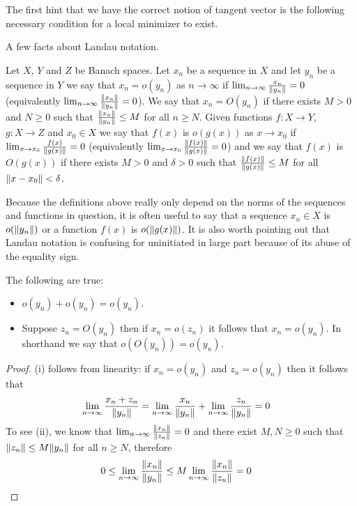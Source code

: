 The first hint that we have the correct notion of tangent vector is
the following necessary condition for a local minimizer to exist.

A few facts about Landau notation.
\begin{defn}Let $X$, $Y$ and $Z$ be Banach spaces.  Let $x_n$ be a sequence in $X$ and let
  $y_n$ be a sequence in  $Y$ we say that $x_n = o(y_n)$
  as $n \to \infty$ if $\lim_{n \to \infty} \frac{x_n}{\lVert y_n \rVert} =
  0$ (equivalently $\lim_{n \to \infty} \frac{\lVert x_n \rVert}{\lVert y_n \rVert} =
  0$).  We say that $x_n = O(y_n)$ if there exists $M > 0$ and $N \geq
  0$ such that
  $\frac{\lVert x_n \rVert}{\lVert y_n \rVert}  \leq M$ for all $n \geq N$.  
Given functions $f : X \to Y$, $g : X \to Z$ and $x_0 \in X$ we say that
  $f(x)$ is $o(g(x))$ as $x \to x_0$ if $\lim_{x \to x_0}
  \frac{f(x)}{\lVert g(x) \rVert} = 0$ (equivalently $\lim_{x \to x_0}
  \frac{\lVert f(x) \rVert}{\lVert g(x) \rVert} = 0$) and we say that $f(x)$ is
  $O(g(x))$ if there exists $M > 0$ and $\delta > 0$ such that
  $\frac{\lVert f(x) \rVert}{\lVert g(x) \rVert} \leq M$ for all $\lVert x - x_0 \rVert < \delta$.
\end{defn}
Because the definitions above really only depend on the norms of the
sequences and functions in question, it is often useful to say that a
sequence $x_n \in X$ is $o(\lVert y_n \rVert)$ or a function $f(x)$ is
$o(\lVert g(x) \rVert)$.  It is also worth pointing out that Landau notation
is confusing for uninitiated in large part because of its abuse of the
equality sign.  

\begin{prop}\label{LandauNotationIdentities}The following are true:
\begin{itemize}
\item[(i)] $o(y_n) + o(y_n) = o(y_n)$.
\item[(ii)] Suppose $z_n = O(y_n)$ then if $x_n = o(z_n)$ it follows
  that $x_n = o(y_n)$.  In shorthand we say that $o(O(y_n)) = o(y_n)$.
\end{itemize}
\end{prop}
\begin{proof}
(i) follows from linearity: if $x_n = o(y_n)$ and $z_n = o(y_n)$ then
it follows that 
\begin{align*}
\lim_{n \to \infty} \frac{x_n + z_n}{\lVert y_n \rVert} &= 
\lim_{n \to \infty} \frac{x_n}{\lVert y_n \rVert}
+ \lim_{n \to \infty} \frac{z_n}{\lVert y_n \rVert}
= 0
\end{align*}
To see (ii), we know that $\lim_{n \to \infty} \frac{\lVert x_n \rVert}{\lVert z_n \rVert} =
0$ and there exist $M,N \geq 0$ such that $\lVert z_n \rVert \leq M
\lVert y_n \rVert$ for all $n \geq N$, therefore 
\begin{align*}
0 &\leq \lim_{n \to \infty} \frac{\lVert x_n \rVert}{\lVert y_n \rVert} \leq M \lim_{n \to \infty}
\frac{\lVert x_n \rVert}{\lVert z_n \rVert} = 0
\end{align*}
\end{proof}


